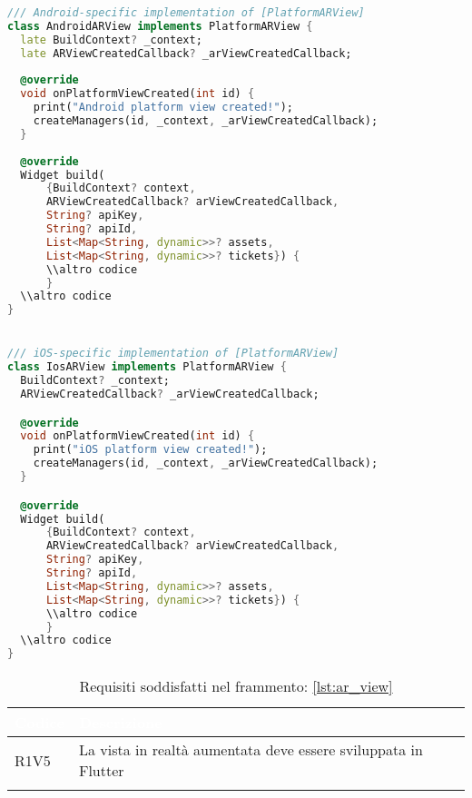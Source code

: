 \begin{lstlisting}[language=dart, label={lst:ar_view}, firstnumber=1,caption={Frammento di codice per vista in realtà aumenta in Dart}]
/// Android-specific implementation of [PlatformARView]
class AndroidARView implements PlatformARView {
  late BuildContext? _context;
  late ARViewCreatedCallback? _arViewCreatedCallback;
  
  @override
  void onPlatformViewCreated(int id) {
    print("Android platform view created!");
    createManagers(id, _context, _arViewCreatedCallback);
  }
  
  @override
  Widget build(
      {BuildContext? context,
      ARViewCreatedCallback? arViewCreatedCallback,
      String? apiKey,
      String? apiId,
      List<Map<String, dynamic>>? assets,
      List<Map<String, dynamic>>? tickets}) {
      \\altro codice
      }
  \\altro codice
}


/// iOS-specific implementation of [PlatformARView]
class IosARView implements PlatformARView {
  BuildContext? _context;
  ARViewCreatedCallback? _arViewCreatedCallback;

  @override
  void onPlatformViewCreated(int id) {
    print("iOS platform view created!");
    createManagers(id, _context, _arViewCreatedCallback);
  }

  @override
  Widget build(
      {BuildContext? context,
      ARViewCreatedCallback? arViewCreatedCallback,
      String? apiKey,
      String? apiId,
      List<Map<String, dynamic>>? assets,
      List<Map<String, dynamic>>? tickets}) {
      \\altro codice
      }
  \\altro codice
}
\end{lstlisting}

{
    \setlength{\freewidth}{\dimexpr\textwidth-10\tabcolsep}
    \renewcommand{\arraystretch}{1.5}
    \centering
    \setlength{\aboverulesep}{0pt}
    \setlength{\belowrulesep}{0pt}
    \begin{longtable}{C{.15\freewidth} C{.965\freewidth}}
       \toprule
    \textcolor{white}{\textbf{Codice}}&
    \textcolor{white}{\textbf{Descrizione}}\\
    \toprule
    \endhead

    R1V5 & La vista in realtà aumentata deve essere sviluppata in Flutter\\
  
    \bottomrule
    \caption{Requisiti soddisfatti nel frammento: \ref{lst:ar_view}}
    \end{longtable}
}

